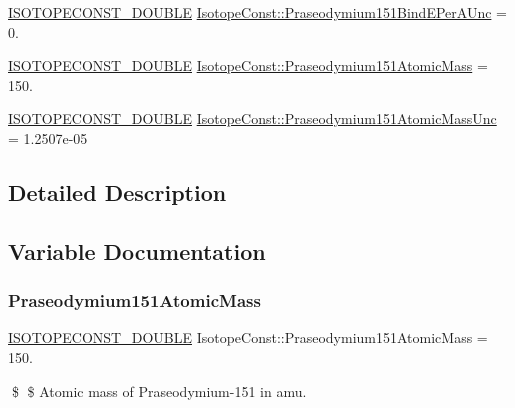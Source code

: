 \begin{DoxyCompactItemize}
\item 
\mbox{\hyperlink{group___isotope_const-_macros_ga8f45a7272ce02c0b4c65c44636ed719a}{I\+S\+O\+T\+O\+P\+E\+C\+O\+N\+S\+T\+\_\+\+D\+O\+U\+B\+LE}} \mbox{\hyperlink{group___isotope_const-_praseodymium-_pr151_gab49293d528a071967a723df8ac2473eb}{Isotope\+Const\+::\+Praseodymium151\+Bind\+E\+Per\+A\+Unc}} = 0.
\item 
\mbox{\hyperlink{group___isotope_const-_macros_ga8f45a7272ce02c0b4c65c44636ed719a}{I\+S\+O\+T\+O\+P\+E\+C\+O\+N\+S\+T\+\_\+\+D\+O\+U\+B\+LE}} \mbox{\hyperlink{group___isotope_const-_praseodymium-_pr151_ga8e5c4d105f9f62dab1cf0b62fbcf5d4a}{Isotope\+Const\+::\+Praseodymium151\+Atomic\+Mass}} = 150.
\item 
\mbox{\hyperlink{group___isotope_const-_macros_ga8f45a7272ce02c0b4c65c44636ed719a}{I\+S\+O\+T\+O\+P\+E\+C\+O\+N\+S\+T\+\_\+\+D\+O\+U\+B\+LE}} \mbox{\hyperlink{group___isotope_const-_praseodymium-_pr151_gadfb3293b38d62032fc1b007cae1dde33}{Isotope\+Const\+::\+Praseodymium151\+Atomic\+Mass\+Unc}} = 1.\+2507e-\/05
\end{DoxyCompactItemize}


\subsection{Detailed Description}


\subsection{Variable Documentation}
\mbox{\label{group___isotope_const-_praseodymium-_pr151_ga8e5c4d105f9f62dab1cf0b62fbcf5d4a}} 
\subsubsection{\texorpdfstring{Praseodymium151\+Atomic\+Mass}{Praseodymium151AtomicMass}}
{\footnotesize\ttfamily \mbox{\hyperlink{group___isotope_const-_macros_ga8f45a7272ce02c0b4c65c44636ed719a}{I\+S\+O\+T\+O\+P\+E\+C\+O\+N\+S\+T\+\_\+\+D\+O\+U\+B\+LE}} Isotope\+Const\+::\+Praseodymium151\+Atomic\+Mass = 150.}

\$ \$ Atomic mass of Praseodymium-\/151 in amu. \mbox{\label{group___isotope_const-_praseodymium-_pr151_gadfb3293b38d62032fc1b007cae1dde33}} 
